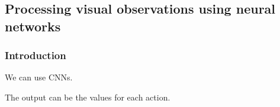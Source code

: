 
\subsection{Processing visual observations using neural networks}

\subsubsection{Introduction}

We can use CNNs.

The output can be the values for each action.
